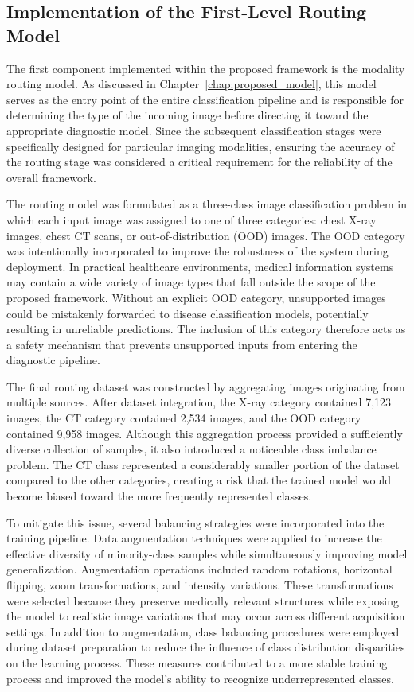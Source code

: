 \subsection[Routing Model Implementation]{Implementation of the First-Level Routing Model}
\label{sec:routing_model_implementation}

The first component implemented within the proposed framework is the modality routing model. As discussed in Chapter~\ref{chap:proposed_model}, this model serves as the entry point of the entire classification pipeline and is responsible for determining the type of the incoming image before directing it toward the appropriate diagnostic model. Since the subsequent classification stages were specifically designed for particular imaging modalities, ensuring the accuracy of the routing stage was considered a critical requirement for the reliability of the overall framework.

The routing model was formulated as a three-class image classification problem in which each input image was assigned to one of three categories: chest X-ray images, chest CT scans, or out-of-distribution (OOD) images. The OOD category was intentionally incorporated to improve the robustness of the system during deployment. In practical healthcare environments, medical information systems may contain a wide variety of image types that fall outside the scope of the proposed framework. Without an explicit OOD category, unsupported images could be mistakenly forwarded to disease classification models, potentially resulting in unreliable predictions. The inclusion of this category therefore acts as a safety mechanism that prevents unsupported inputs from entering the diagnostic pipeline.

The final routing dataset was constructed by aggregating images originating from multiple sources. After dataset integration, the X-ray category contained 7,123 images, the CT category contained 2,534 images, and the OOD category contained 9,958 images. Although this aggregation process provided a sufficiently diverse collection of samples, it also introduced a noticeable class imbalance problem. The CT class represented a considerably smaller portion of the dataset compared to the other categories, creating a risk that the trained model would become biased toward the more frequently represented classes.

To mitigate this issue, several balancing strategies were incorporated into the training pipeline. Data augmentation techniques were applied to increase the effective diversity of minority-class samples while simultaneously improving model generalization. Augmentation operations included random rotations, horizontal flipping, zoom transformations, and intensity variations. These transformations were selected because they preserve medically relevant structures while exposing the model to realistic image variations that may occur across different acquisition settings. In addition to augmentation, class balancing procedures were employed during dataset preparation to reduce the influence of class distribution disparities on the learning process. These measures contributed to a more stable training process and improved the model's ability to recognize underrepresented classes.

